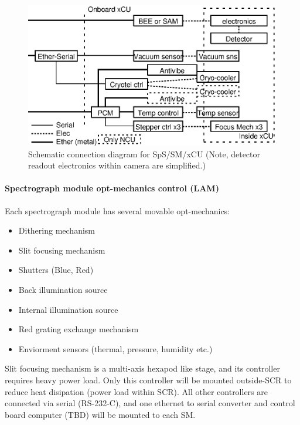 \documentclass[a4paper,notitlepage]{article}
\begin{document}
\begin{figure}[htb]
  \begin{center}
    \includegraphics{networks-xcu.eps}
  \end{center}
  \caption{Schematic connection diagram for SpS/SM/xCU
     (Note, detector readout electronics within camera are simplified.)}
  \label{fig:sps-xcu-control}
\end{figure}


\paragraph{Spectrograph module opt-mechanics control (LAM)}

Each spectrograph module has several movable opt-mechanics: 

\begin{itemize}
  \item Dithering mechanism
  \item Slit focusing mechanism
  \item Shutters (Blue, Red)
  \item Back illumination source
  \item Internal illumination source
  \item Red grating exchange mechanism
  \item Enviorment sensors (thermal, pressure, humidity etc.)
\end{itemize}

Slit focusing mechanism is a multi-axis hexapod like stage, and its 
controller requires heavy power load. Only this controller will be mounted 
outside-SCR to reduce heat disipation (power load within SCR). 
All other controllers are connected via serial (RS-232-C), and one ethernet 
to serial converter and control board computer (TBD) 
will be mounted to each SM. 
\end{document}
